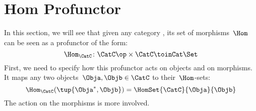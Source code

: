 \section{Hom Profunctor}


In this section, we will see that given any category \CatC, its set of morphisms~$\Hom$ can be seen as a profunctor of the form:
\begin{equation*}
    \Hom_\CatC\colon \CatC \op \times \CatC \toinCat \Set
\end{equation*}
First, we need to specify how this profunctor acts on objects and on morphisms.
It maps any two objects~$\Obja,\Objb\in \CatC$ to their~$\Hom$-sets:
\begin{equation*}
    \Hom_\CatC(\tup{\Obja^*,\Objb})=\HomSet{\CatC}{\Obja}{\Objb}
\end{equation*}
The action on the morphisms is more involved.

\devel{}


